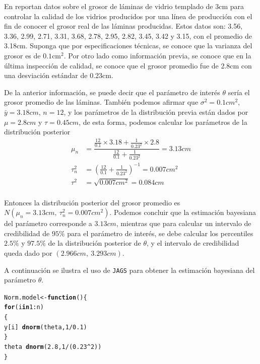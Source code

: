 \documentclass[10pt,openright]{book}\usepackage[]{graphicx}\usepackage[]{color}
\makeatletter
\newcommand{\hlnum}[1]{\textcolor[rgb]{0.686,0.059,0.569}{#1}}%
\newcommand{\hlopt}[1]{\textcolor[rgb]{0,0,0}{#1}}%
\newcommand{\hlstd}[1]{\textcolor[rgb]{0.345,0.345,0.345}{#1}}%
\newcommand{\hlkwa}[1]{\textcolor[rgb]{0.161,0.373,0.58}{\textbf{#1}}}%
\newcommand{\hlkwb}[1]{\textcolor[rgb]{0.69,0.353,0.396}{#1}}%
\newcommand{\hlkwd}[1]{\textcolor[rgb]{0.737,0.353,0.396}{\textbf{#1}}}%
\newenvironment{kframe}{%
 \def\at@end@of@kframe{}%
 \ifinner\ifhmode%
  \def\at@end@of@kframe{\end{minipage}}%
  \begin{minipage}{\columnwidth}%
 \fi\fi%
 \def\FrameCommand##1{\hskip\@totalleftmargin \hskip-\fboxsep
 \colorbox{shadecolor}{##1}\hskip-\fboxsep
     \hskip-\linewidth \hskip-\@totalleftmargin \hskip\columnwidth}%
 \MakeFramed {\advance\hsize-\width
   \@totalleftmargin\z@ \linewidth\hsize
   \@setminipage}}%
 {\par\unskip\endMakeFramed%
 \at@end@of@kframe}
\newenvironment{knitrout}{}{} %
\makeatother
\begin{document}
    \begin{Eje}\label{eje_vidrios}
    En  reportan datos sobre el grosor de l\'aminas de vidrio templado de 3cm para controlar la calidad de los vidrios producidos por una l\'inea de producci\'on con el fin de conocer el grosor real de las l\'aminas producidas. Estos datos son: 3.56, 3.36, 2.99, 2.71, 3.31, 3.68, 2.78, 2.95, 2.82, 3.45, 3.42 y 3.15, con el promedio de 3.18cm. Suponga que por especificaciones t\'ecnicas, se conoce que la varianza del grosor es de $0.1\text{cm}^2$. Por otro lado como informaci\'on previa, se conoce que en la \'ultima inspecci\'on de calidad, se conoce que el grosor promedio fue de 2.8cm con una desviaci\'on est\'andar de 0.23cm.
    
    De la anterior informaci\'on, se puede decir que el par\'ametro de inter\'es $\theta$ ser\'ia el grosor promedio de las l\'aminas. Tambi\'en podemos afirmar que $\sigma^2=0.1cm^2$, $\bar{y}=3.18cm$, $n=12$, y los par\'ametros de la distribuci\'on previa est\'an dados por $\mu=2.8cm$ y $\tau=0.45cm$, de esta forma, podemos calcular los par\'ametros de la distribuci\'on posterior
    \begin{align*}
    \mu_n&=\dfrac{\frac{12}{0.1}\times 3.18+\frac{1}{0.23^2}\times 2.8}{\frac{12}{0.1}+\frac{1}{0.23^2}}=3.13cm\\
    \tau^2_n&=\left(\frac{12}{0.1}+\frac{1}{0.23^2}\right)^{-1}=0.007cm^2\\
      \tau^2&=\sqrt{0.007cm^2}=0.084cm\\
    \end{align*}
    
    Entonces la distribuci\'on posterior del grosor promedio es $N(\mu_n=3.13cm,\ \tau^2_n=0.007cm^2)$. Podemos concluir que la estimaci\'on bayesiana del par\'ametro corresponde a $3.13cm$, mientras que para calcular un intervalo de credibilidad de $95\%$ para el par\'ametro de inter\'es, se debe calcular los percentiles $2.5\%$ y $97.5\%$ de la distribuci\'on posterior de $\theta$, y el intervalo de credibilidad queda dado por $(2.966cm,\ 3.293cm)$.
    
    A continuaci\'on se ilustra el uso de \verb'JAGS' para obtener la estimaci\'on bayesiana del par\'ametro $\theta$.
    
\begin{knitrout}
\color{fgcolor}\begin{kframe}
\begin{alltt}
\hlstd{Norm.model} \hlkwb{<-} \hlkwa{function}\hlstd{()\{}
\hlkwa{for}\hlstd{(i} \hlkwa{in} \hlnum{1} \hlopt{:} \hlstd{n)}
\hlstd{\{}
\hlstd{y[i]} \hlopt{~} \hlkwd{dnorm}\hlstd{(theta,} \hlnum{1}\hlopt{/}\hlnum{0.1}\hlstd{)}
\hlstd{\}}
\hlstd{theta} \hlopt{~} \hlkwd{dnorm}\hlstd{(}\hlnum{2.8}\hlstd{,} \hlnum{1}\hlopt{/}\hlstd{(}\hlnum{0.23}\hlopt{^}\hlnum{2}\hlstd{) )}
\hlstd{\}}


\end{alltt}
\end{kframe}
\end{knitrout}
\end{Eje}
\end{document}
